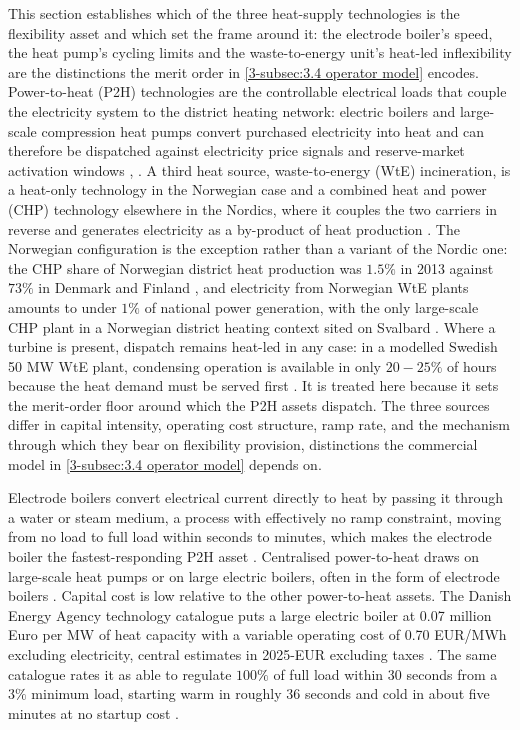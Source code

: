This section establishes which of the three heat-supply technologies is the flexibility asset and which set the frame around it: the electrode boiler's speed, the heat pump's cycling limits and the waste-to-energy unit's heat-led inflexibility are the distinctions the merit order in \autoref{3-subsec:3.4 operator model} encodes. Power-to-heat (P2H) technologies are the controllable electrical loads that couple the electricity system to the district heating network: electric boilers and large-scale compression heat pumps convert purchased electricity into heat and can therefore be dispatched against electricity price signals and reserve-market activation windows \cite{bloes_power--heat_2018}, \cite{golmohamadi_integration_2022}. A third heat source, waste-to-energy (WtE) incineration, is a heat-only technology in the Norwegian case and a combined heat and power (CHP) technology elsewhere in the Nordics, where it couples the two carriers in reverse and generates electricity as a by-product of heat production \cite{beiron_combined_2020}. The Norwegian configuration is the exception rather than a variant of the Nordic one: the CHP share of Norwegian district heat production was $1.5\%$ in 2013 against $73\%$ in Denmark and Finland \cite{sandberg_framework_2018}, and electricity from Norwegian WtE plants amounts to under $1\%$ of national power generation, with the only large-scale CHP plant in a Norwegian district heating context sited on Svalbard \cite{norsk_fjernvarme_fakta_nodate}. Where a turbine is present, dispatch remains heat-led in any case: in a modelled Swedish 50 MW WtE plant, condensing operation is available in only $20 - 25\%$ of hours because the heat demand must be served first \cite{beiron_combined_2020}. It is treated here because it sets the merit-order floor around which the P2H assets dispatch. The three sources differ in capital intensity, operating cost structure, ramp rate, and the mechanism through which they bear on flexibility provision, distinctions the commercial model in \autoref{3-subsec:3.4 operator model} depends on.

Electrode boilers convert electrical current directly to heat by passing it through a water or steam medium, a process with effectively no ramp constraint, moving from no load to full load within seconds to minutes, which makes the electrode boiler the fastest-responding P2H asset \cite{maruf_classification_2022}. Centralised power-to-heat draws on large-scale heat pumps or on large electric boilers, often in the form of electrode boilers \cite{bloes_power--heat_2018}. Capital cost is low relative to the other power-to-heat assets. The Danish Energy Agency technology catalogue puts a large electric boiler at 0.07 million Euro per MW of heat capacity with a variable operating cost of 0.70 EUR/MWh excluding electricity, central estimates in 2025-EUR excluding taxes \cite{danish_energy_agency_technology_2024}. The same catalogue rates it as able to regulate $100\%$ of full load within 30 seconds from a $3\%$ minimum load, starting warm in roughly 36 seconds and cold in about five minutes at no startup cost \cite{danish_energy_agency_technology_2024}.

